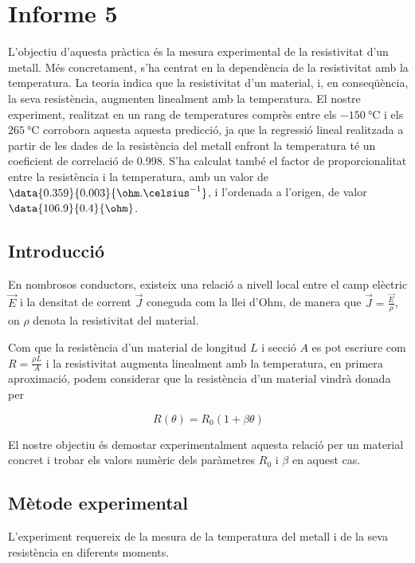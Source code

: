 
\chapter{Informe 5}
\begin{resum}
	L'objectiu d'aquesta pràctica és la mesura experimental de la resistivitat d'un metall. Més concretament, s'ha centrat en la dependència de la resistivitat amb la temperatura. La teoria indica que la resistivitat d'un material, i, en conseqüència, la seva resistència, augmenten linealment amb la temperatura. El nostre experiment, realitzat en un rang de temperatures comprès entre els $\SI{-150}{\celsius}$ i els $\SI{265}{\celsius}$ corrobora aquesta aquesta predicció, ja que la regressió lineal realitzada a partir de les dades de la resistència del metall enfront la temperatura té un coeficient de correlació de 0.998. S'ha calculat també el factor de proporcionalitat entre la resistència i la temperatura, amb un valor de $\data{0.359}{0.003}{\ohm.\celsius^{-1}}$, i l'ordenada a l'origen, de valor $\data{106.9}{0.4}{\ohm}$.
\end{resum}

\section{Introducció}
En nombrosos conductors, existeix una relació a nivell local entre el camp elèctric $\vec{E}$ i la densitat de corrent $\vec{J}$ coneguda com la llei d'Ohm, de manera que $\vec{J}=\frac{\vec{E}}{\rho}$, on $\rho$ denota la resistivitat del material.

Com que la resistència d'un material de longitud $L$ i secció $A$ es pot escriure com $R=\frac{\rho L}{A}$ i la resistivitat augmenta linealment amb la temperatura, en primera aproximació, podem considerar que la resistència d'un material vindrà donada per 

\begin{equation} \label{eq: <regressio>}
R(\theta)=R_0(1+\beta\theta)
\end{equation}

El nostre objectiu és demostar experimentalment aquesta relació per un material concret i trobar els valors numèric dels paràmetres $R_0$ i $\beta$ en aquest cas.

\section{Mètode experimental}

L'experiment requereix de la mesura de la temperatura del metall i de la seva resistència en diferents moments.

